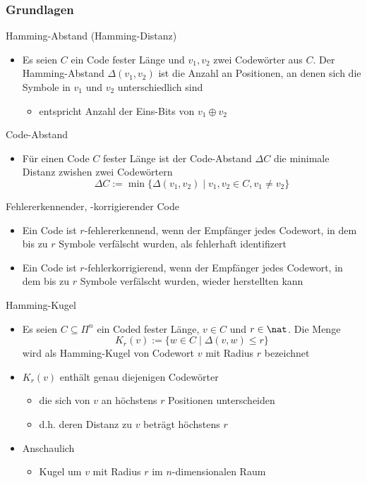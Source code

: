     \subsubsection{Grundlagen}
      Hamming-Abstand (Hamming-Distanz)
      \begin{itemize}
        \item Es seien $C$ ein Code fester Länge und $v_1,v_2$ zwei Codewörter aus $C$. Der
          Hamming-Abstand $\Delta(v_1,v_2)$ ist die Anzahl an Positionen, an denen sich die
          Symbole in $v_1$ und $v_2$ unterschiedlich sind
          \begin{itemize}
            \item entspricht Anzahl der Eins-Bits von $v_1\oplus v_2$
          \end{itemize}
      \end{itemize}
      Code-Abstand
      \begin{itemize}
        \item Für einen Code $C$ fester Länge ist der Code-Abstand $\Delta C$ die minimale
          Distanz zwishen zwei Codewörtern
          $$\Delta C:=\min\{\Delta(v_1,v_2)\mid v_1,v_2\in C,v_1\neq v_2\}$$
      \end{itemize}
      Fehlererkennender, -korrigierender Code
      \begin{itemize}
        \item Ein Code ist $r$-fehlererkennend, wenn der Empfänger jedes Codewort, in dem
          bis zu $r$ Symbole verfälscht wurden, als fehlerhaft identifizert
        \item Ein Code ist $r$-fehlerkorrigierend, wenn der Empfänger jedes Codewort, in
          dem bis zu $r$ Symbole verfälscht wurden, wieder herstellten kann
      \end{itemize}
      Hamming-Kugel
      \begin{itemize}
        \item Es seien $C\subseteq\Pi^n$ ein Coded fester Länge, $v\in C$ und $r\in\nat$. Die Menge
          $$K_r(v):=\{w\in C\mid\Delta(v,w)\le r\}$$
          wird als Hamming-Kugel von Codewort $v$ mit Radius $r$ bezeichnet
        \item $K_r(v)$ enthält genau diejenigen Codewörter
          \begin{itemize}
            \item die sich von $v$ an höchstens $r$ Positionen unterscheiden
            \item d.h. deren Distanz zu $v$ beträgt höchstens $r$
          \end{itemize}
        \item Anschaulich
          \begin{itemize}
            \item Kugel um $v$ mit Radius $r$ im $n$-dimensionalen Raum
          \end{itemize}
      \end{itemize}
